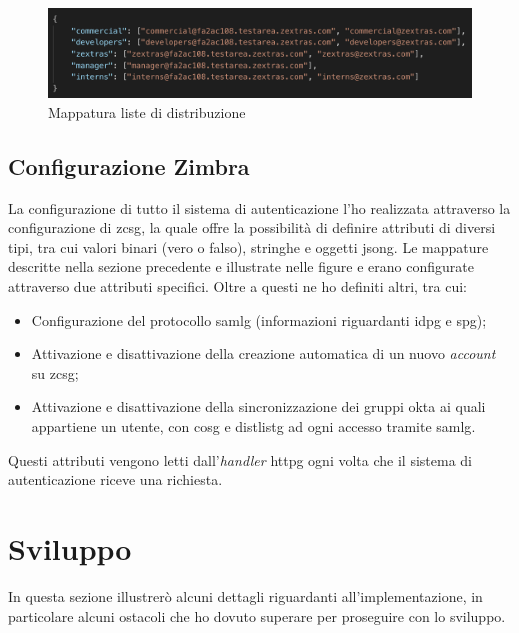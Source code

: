      \begin{figure}[ht]
        \centering
        \includegraphics[width=1\textwidth]{immagini/distListMapping.png}
        \caption{Mappatura liste di distribuzione}
        \label{fig: Mappatura liste di distribuzione}
    \end{figure}

\subsection{Configurazione Zimbra}
La configurazione di tutto il sistema di autenticazione l'ho realizzata attraverso la configurazione di \gls{zcsg}, la quale offre la possibilità di definire attributi di diversi tipi, tra cui valori binari (vero o falso), stringhe e oggetti \gls{jsong}. Le mappature descritte nella sezione precedente e illustrate nelle figure  e  erano configurate attraverso due attributi specifici. Oltre a questi ne ho definiti altri, tra cui:
\begin{itemize}
    \item Configurazione del protocollo \gls{samlg} (informazioni riguardanti \gls{idpg} e \gls{spg});
    \item Attivazione e disattivazione della creazione automatica di un nuovo \textit{account}  su \gls{zcsg};
    \item Attivazione e disattivazione della sincronizzazione dei gruppi \gls{okta} ai quali appartiene un utente, con \gls{cosg} e \gls{distlistg} ad ogni accesso tramite \gls{samlg}.
\end{itemize}
Questi attributi vengono letti dall'\textit{handler} \gls{httpg} ogni volta che il sistema di autenticazione riceve una richiesta.

\section{Sviluppo}
In questa sezione illustrerò alcuni dettagli riguardanti all'implementazione, in particolare alcuni ostacoli che ho dovuto superare per proseguire con lo sviluppo.
